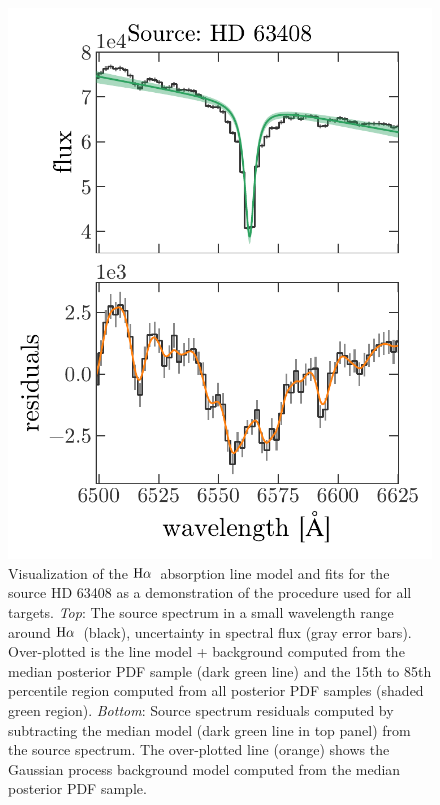 \documentclass[modern, letterpaper]{aastex61}
\newcommand{\Ha}{\ensuremath{{\rm H}\alpha}}
\begin{document}
\begin{figure}[htbp]
  \begin{center}
    \includegraphics[width=0.7\linewidth]{mcmc_example_fit.pdf}
  \end{center}
  \caption{%
    Visualization of the \Ha\ absorption line model and fits for the source HD
    63408 as a demonstration of the procedure used for all targets.
    \emph{Top}:
    The source spectrum in a small wavelength range around \Ha\ (black),
    uncertainty in spectral flux (gray error bars).
    Over-plotted is the line model + background computed from the median
    posterior PDF sample (dark green line) and the 15th to 85th percentile
    region computed from all posterior PDF samples (shaded green region).
    \emph{Bottom}:
    Source spectrum residuals computed by subtracting the median model (dark
    green line in top panel) from the source spectrum.
    The over-plotted line (orange) shows the Gaussian process background model
    computed from the median posterior PDF sample.
    \label{fig:Halpha-mcmc-fit}}
\end{figure}
\end{document}
